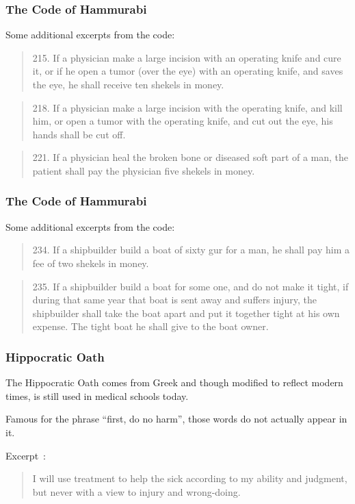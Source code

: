 \begin{frame}
\frametitle{The Code of Hammurabi}

Some additional excerpts from the code:

\begin{quote}
215.	If a physician make a large incision with an operating knife
		and cure it, or if he open a tumor (over the eye) with an
		operating knife, and saves the eye, he shall receive ten
		shekels in money.
\end{quote}


\begin{quote}
	218.	If a physician make a large incision with the operating
		knife, and kill him, or open a tumor with the operating knife,
		and cut out the eye, his hands shall be cut off.
\end{quote}


\begin{quote}
	221.	If a physician heal the broken bone or diseased soft part of
		a man, the patient shall pay the physician five shekels in 			money.

\end{quote}


\end{frame}

\begin{frame}
\frametitle{The Code of Hammurabi}

Some additional excerpts from the code:

\begin{quote}
	234.	If a shipbuilder build a boat of sixty gur for a man, he shall
		pay him a fee of two shekels in money.
\end{quote}


\begin{quote}
	235.	If a shipbuilder build a boat for some one, and do not make
		it tight, if during that same year that boat is sent away and
		suffers injury, the shipbuilder shall take the boat apart and
		put it together tight at his own expense. The tight boat he
		shall give to the boat owner.
\end{quote}

\end{frame}



\begin{frame}
\frametitle{Hippocratic Oath}

The Hippocratic Oath comes from Greek and though modified to reflect modern times, is still used in medical schools today.

Famous for the phrase ``first, do no harm'', those words do not actually appear in it.

Excerpt~\cite{hippocratic}:
\begin{quote}
I will use treatment to help the sick according to my ability and judgment, but never with a view to injury and wrong-doing.
\end{quote}



\end{frame}



